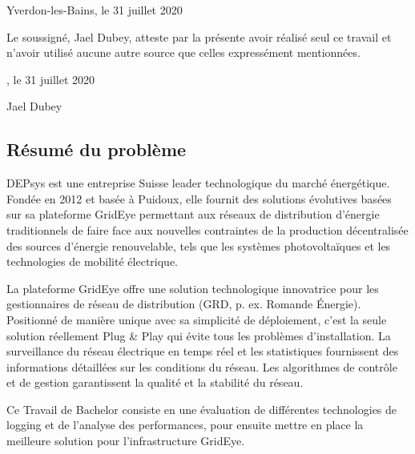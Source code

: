 \documentclass[paper=a4, fontsize=11pt]{scrartcl}
\begin{document}
  \vspace{3cm}
  
  Yverdon-les-Bains, le 31 juillet 2020
  
  \newpage
  

Le soussigné, Jael Dubey, atteste par la présente avoir réalisé seul ce travail et n’avoir utilisé aucune autre source que celles expressément mentionnées.

\vspace{2cm}

, le 31 juillet 2020

\vspace{3cm}

\begin{flushright}
    \begin{minipage}{7cm}
        {Jael Dubey}
    \end{minipage}\hfill
\end{flushright}

\newpage

\subsection*{Résumé du problème}
DEPsys est une entreprise Suisse leader technologique du marché énergétique. Fondée en 2012 et basée à Puidoux, elle fournit des solutions évolutives basées sur sa plateforme GridEye permettant aux réseaux de distribution d'énergie traditionnels de faire face aux nouvelles contraintes de la production décentralisée des sources d'énergie renouvelable, tels que les systèmes photovoltaïques et les technologies de mobilité électrique.

La plateforme GridEye offre une solution technologique innovatrice pour les gestionnaires de réseau de distribution (GRD, p. ex. Romande Énergie). Positionné de manière unique avec sa simplicité de déploiement, c'est la seule solution réellement Plug \& Play qui évite tous les problèmes d'installation. La surveillance du réseau électrique en temps réel et les statistiques fournissent des informations détaillées sur les conditions du réseau. Les algorithmes de contrôle et de gestion garantissent la qualité et la stabilité du réseau.

Ce Travail de Bachelor consiste en une évaluation de différentes technologies de logging et de l'analyse des performances, pour ensuite mettre en place la meilleure solution pour l'infrastructure GridEye.
\end{document}
